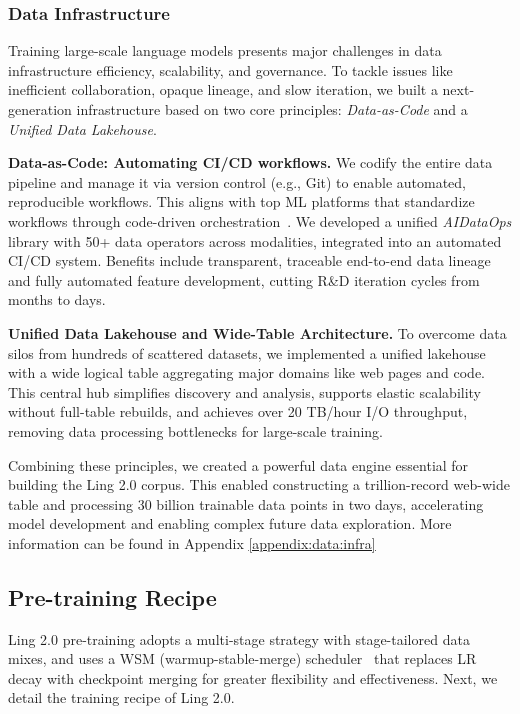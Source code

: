 \subsubsection{Data Infrastructure}
Training large-scale language models presents major challenges in data infrastructure efficiency, scalability, and governance. To tackle issues like inefficient collaboration, opaque lineage, and slow iteration, we built a next-generation infrastructure based on two core principles: \emph{Data-as-Code} and a \emph{Unified Data Lakehouse}.

{\bfseries Data-as-Code: Automating CI/CD workflows.} 
We codify the entire data pipeline and manage it via version control (e.g., Git) to enable automated, reproducible workflows. This aligns with top ML platforms that standardize workflows through code-driven orchestration~\citep{datainfra1}. We developed a unified \emph{AIDataOps} library with 50+ data operators across modalities, integrated into an automated CI/CD system. Benefits include transparent, traceable end-to-end data lineage and fully automated feature development, cutting R\&D iteration cycles from months to days.

{\bfseries Unified Data Lakehouse and Wide-Table Architecture.}  
To overcome data silos from hundreds of scattered datasets, we implemented a unified lakehouse~\citep{datainfra2} with a wide logical table aggregating major domains like web pages and code. This central hub simplifies discovery and analysis, supports elastic scalability without full-table rebuilds, and achieves over 20 TB/hour I/O throughput, removing data processing bottlenecks for large-scale training.

Combining these principles, we created a powerful data engine essential for building the Ling 2.0 corpus. This enabled constructing a trillion-record web-wide table and processing 30 billion trainable data points in two days, accelerating model development and enabling complex future data exploration. More information can be found in Appendix \ref{appendix:data:infra}







\subsection{Pre-training Recipe}
Ling 2.0 pre-training adopts a multi-stage strategy with stage-tailored data mixes, and uses a WSM (warmup-stable-merge) scheduler~\citep{tian2025wsmdecayfreelearningrate} that replaces LR decay with checkpoint merging for greater flexibility and effectiveness. 
Next, we detail the training recipe of Ling 2.0. 

